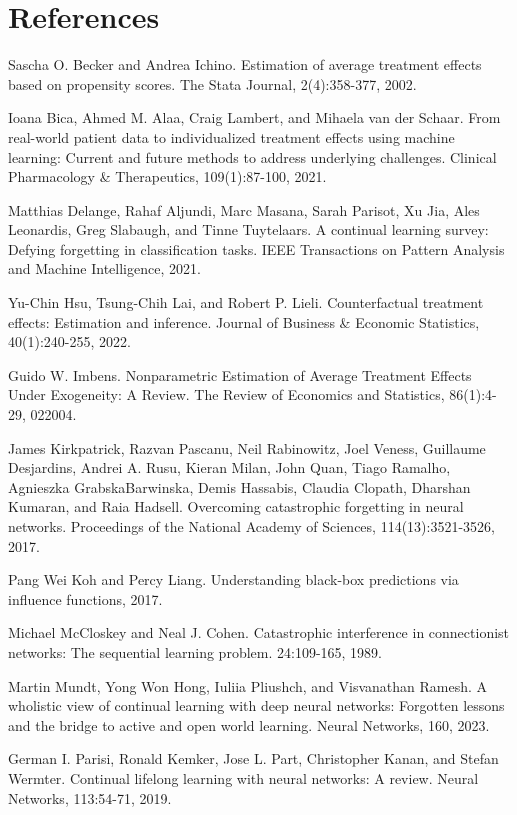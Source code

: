 \documentclass[10pt]{article}
\begin{document}
\section*{References}
Sascha O. Becker and Andrea Ichino. Estimation of average treatment effects based on propensity scores. The Stata Journal, 2(4):358-377, 2002.

Ioana Bica, Ahmed M. Alaa, Craig Lambert, and Mihaela van der Schaar. From real-world patient data to individualized treatment effects using machine learning: Current and future methods to address underlying challenges. Clinical Pharmacology \& Therapeutics, 109(1):87-100, 2021.

Matthias Delange, Rahaf Aljundi, Marc Masana, Sarah Parisot, Xu Jia, Ales Leonardis, Greg Slabaugh, and Tinne Tuytelaars. A continual learning survey: Defying forgetting in classification tasks. IEEE Transactions on Pattern Analysis and Machine Intelligence, 2021.

Yu-Chin Hsu, Tsung-Chih Lai, and Robert P. Lieli. Counterfactual treatment effects: Estimation and inference. Journal of Business \& Economic Statistics, 40(1):240-255, 2022.

Guido W. Imbens. Nonparametric Estimation of Average Treatment Effects Under Exogeneity: A Review. The Review of Economics and Statistics, 86(1):4-29, 022004.

James Kirkpatrick, Razvan Pascanu, Neil Rabinowitz, Joel Veness, Guillaume Desjardins, Andrei A. Rusu, Kieran Milan, John Quan, Tiago Ramalho, Agnieszka GrabskaBarwinska, Demis Hassabis, Claudia Clopath, Dharshan Kumaran, and Raia Hadsell. Overcoming catastrophic forgetting in neural networks. Proceedings of the National Academy of Sciences, 114(13):3521-3526, 2017.

Pang Wei Koh and Percy Liang. Understanding black-box predictions via influence functions, 2017.

Michael McCloskey and Neal J. Cohen. Catastrophic interference in connectionist networks: The sequential learning problem. 24:109-165, 1989.

Martin Mundt, Yong Won Hong, Iuliia Pliushch, and Visvanathan Ramesh. A wholistic view of continual learning with deep neural networks: Forgotten lessons and the bridge to active and open world learning. Neural Networks, 160, 2023.

German I. Parisi, Ronald Kemker, Jose L. Part, Christopher Kanan, and Stefan Wermter. Continual lifelong learning with neural networks: A review. Neural Networks, 113:54-71, 2019.
\end{document}
